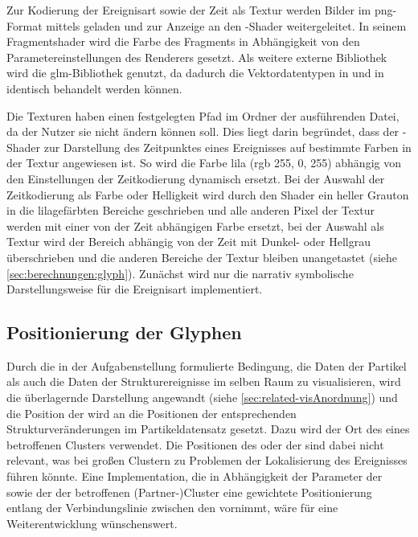 Zur Kodierung der Ereignisart sowie der Zeit als Textur werden Bilder im \gls{png}-Format mittels  geladen und zur Anzeige an den -Shader weitergeleitet. In seinem Fragmentshader wird die Farbe des Fragments in Abhängigkeit von den Parametereinstellungen des Renderers gesetzt.
Als weitere externe Bibliothek wird die \gls{glm}-Bibliothek genutzt, da dadurch die Vektordatentypen in  und in  identisch behandelt werden können.

Die Texturen haben einen festgelegten Pfad im Ordner der ausführenden Datei, da der Nutzer sie nicht ändern können soll. Dies liegt darin begründet, dass der -Shader zur Darstellung des Zeitpunktes eines Ereignisses auf bestimmte Farben in der Textur angewiesen ist. So wird die Farbe lila (rgb 255, 0, 255) abhängig von den Einstellungen der Zeitkodierung dynamisch ersetzt. Bei der Auswahl der Zeitkodierung als Farbe oder Helligkeit wird durch den Shader ein heller Grauton in die lilagefärbten Bereiche geschrieben und alle anderen Pixel der Textur werden mit einer von der Zeit abhängigen Farbe ersetzt, bei der Auswahl als Textur wird der Bereich abhängig von der Zeit mit Dunkel- oder Hellgrau überschrieben und die anderen Bereiche der Textur bleiben unangetastet (siehe \autoref{sec:berechnungen:glyph}). Zunächst wird nur die narrativ symbolische Darstellungsweise für die Ereignisart implementiert.


\subsection*{Positionierung der Glyphen}\label{sec:vis:glyph-pos}

Durch die in der Aufgabenstellung formulierte Bedingung, die Daten der Partikel als auch die Daten der Strukturereignisse im selben Raum zu visualisieren, wird die überlagernde Darstellung angewandt (siehe \autoref{sec:related-visAnordnung}) und die Position der  wird an die Positionen der entsprechenden Strukturveränderungen im Partikeldatensatz gesetzt. Dazu wird der Ort des  eines betroffenen Clusters verwendet. Die Positionen des oder der  sind dabei nicht relevant, was bei großen Clustern zu Problemen der Lokalisierung des Ereignisses führen könnte. Eine Implementation, die in Abhängigkeit der Parameter der  sowie der  der betroffenen (Partner-)Cluster eine gewichtete Positionierung entlang der Verbindungslinie zwischen den  vornimmt, wäre für eine Weiterentwicklung wünschenswert.

